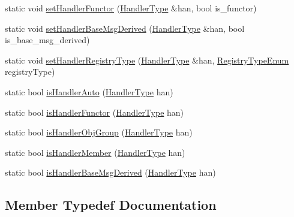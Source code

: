 \begin{DoxyCompactItemize}
\item 
static void \hyperlink{structvt_1_1_handler_manager_a25c8a39b9faea3e894021d5c6d52f903}{set\+Handler\+Functor} (\hyperlink{namespacevt_af64846b57dfcaf104da3ef6967917573}{Handler\+Type} \&han, bool is\+\_\+functor)
\item 
static void \hyperlink{structvt_1_1_handler_manager_a8d5c057635b69508751d9b86bd1d3378}{set\+Handler\+Base\+Msg\+Derived} (\hyperlink{namespacevt_af64846b57dfcaf104da3ef6967917573}{Handler\+Type} \&han, bool is\+\_\+base\+\_\+msg\+\_\+derived)
\item 
static void \hyperlink{structvt_1_1_handler_manager_a2a5f58fcd6fa2b9bdda6b72b59597801}{set\+Handler\+Registry\+Type} (\hyperlink{namespacevt_af64846b57dfcaf104da3ef6967917573}{Handler\+Type} \&han, \hyperlink{namespacevt_1_1auto__registry_a9f369ca2b484130b396729e2ddf05241}{Registry\+Type\+Enum} registry\+Type)
\item 
static bool \hyperlink{structvt_1_1_handler_manager_a3324aeb71747bdd6b99194674dc03434}{is\+Handler\+Auto} (\hyperlink{namespacevt_af64846b57dfcaf104da3ef6967917573}{Handler\+Type} han)
\item 
static bool \hyperlink{structvt_1_1_handler_manager_a0d03f576b15390773522317a4086e725}{is\+Handler\+Functor} (\hyperlink{namespacevt_af64846b57dfcaf104da3ef6967917573}{Handler\+Type} han)
\item 
static bool \hyperlink{structvt_1_1_handler_manager_a41bb9a71156fa3010988e8b576022bf5}{is\+Handler\+Obj\+Group} (\hyperlink{namespacevt_af64846b57dfcaf104da3ef6967917573}{Handler\+Type} han)
\item 
static bool \hyperlink{structvt_1_1_handler_manager_a693afb1f820721217771ff0b9bcd71ae}{is\+Handler\+Member} (\hyperlink{namespacevt_af64846b57dfcaf104da3ef6967917573}{Handler\+Type} han)
\item 
static bool \hyperlink{structvt_1_1_handler_manager_a88c108df63f4d16a17485c08eefe31c5}{is\+Handler\+Base\+Msg\+Derived} (\hyperlink{namespacevt_af64846b57dfcaf104da3ef6967917573}{Handler\+Type} han)
\end{DoxyCompactItemize}


\subsection{Member Typedef Documentation}
\mbox{\label{structvt_1_1_handler_manager_ac2c93e168ab703b2441e0c38aa28a08f}} 
